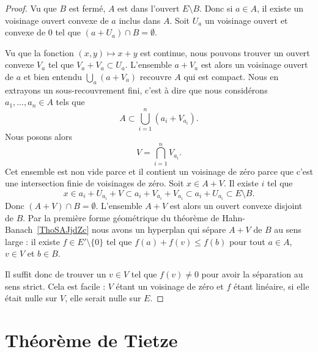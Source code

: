 \begin{proof}
    Vu que \( B\) est fermé, \( A\) est dans l'ouvert \( E\setminus B\). Donc si \( a\in A\), il existe un voisinage ouvert convexe de \( a\) inclus dans \( A\). Soit \( U_a\) un voisinage ouvert et convexe de \( 0\) tel que \( (a+U_a)\cap B=\emptyset\).

    Vu que la fonction \( (x,y)\mapsto x+y\) est continue, nous pouvons trouver un ouvert convexe \( V_a\) tel que \( V_a+V_a\subset U_a\). L'ensemble \( a+V_a\) est alors un voisinage ouvert de \( a\) et bien entendu \( \bigcup_a(a+V_a)\) recouvre \( A\) qui est compact. Nous en extrayons un sous-recouvrement fini, c'est à dire que nous considérons \( a_1,\ldots, a_n\in A\) tels que
    \begin{equation}
        A\subset \bigcup_{i=1}^n(a_i+V_{a_i}).
    \end{equation}
    Nous posons alors
    \begin{equation}
        V=\bigcap_{i=1}^nV_{a_i}.
    \end{equation}
    Cet ensemble est non vide parce et il contient un voisinage de zéro parce que c'est une intersection finie de voisinages de zéro. Soit \( x\in A+V\). Il existe \( i\) tel que
    \begin{equation}
        x\in a_i+U_{a_i}+V\subset a_i+V_{a_i}+V_{a_i}\subset a_i+U_{a_i}\subset E\setminus B.
    \end{equation}
    Donc \( (A+V)\cap B=\emptyset\). L'ensemble \( A+V\) est alors un ouvert convexe disjoint de \( B\). Par la première forme géométrique du théorème de Hahn-Banach~\ref{ThoSAJjdZc} nous avons un hyperplan qui sépare \( A+V\) de \( B\) au sens large : il existe \( f\in E'\setminus\{ 0 \}\) tel que \( f(a)+f(v)\leq f(b)\) pour tout \( a\in A\), \( v\in V\) et \( b\in B\).

    Il suffit donc de trouver un \( v\in V\) tel que \( f(v)\neq 0\) pour avoir la séparation au sens strict. Cela est facile : \( V\) étant un voisinage de zéro et \( f\) étant linéaire, si elle était nulle sur \( V\), elle serait nulle sur \( E\).
\end{proof}

\section{Théorème de Tietze}

